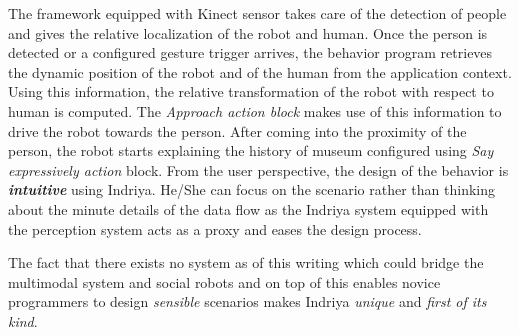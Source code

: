 The framework equipped with Kinect sensor takes care of the detection of people and gives the relative localization of the robot and human. Once the person is detected or a configured gesture trigger arrives, the behavior program retrieves the dynamic position of the robot and of the human from the application context. Using this information, the relative transformation of the robot with respect to human is computed. The \emph{Approach action block} makes use of this information to drive the robot towards the person. After coming into the proximity of the person, the robot starts explaining the history of museum configured using \emph{Say expressively action} block. From the user perspective, the design of the behavior is \textbf{\emph{intuitive}} using Indriya. He/She can focus on the scenario rather than thinking about the minute details of the data flow as the Indriya system equipped with the perception system acts as a proxy and eases the design process. 

The fact that there exists no system as of this writing which could bridge the multimodal system and social robots and on top of this enables novice programmers to design \emph{sensible} scenarios makes Indriya \emph{unique} and \emph{first of its kind}.
